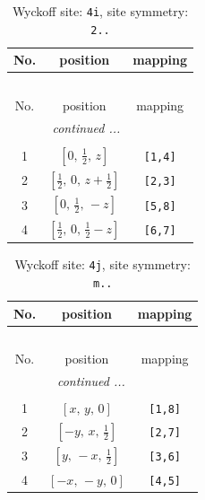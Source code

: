 \documentclass[fleqn,8pt]{jsarticle}
\begin{document}
\renewcommand{\arraystretch}{1.2}
\begin{longtable}{ccc}
\caption{Wyckoff site: {\tt 4i}, site symmetry: {\tt 2..}}
 \\
 \hline \hline
No. & position & mapping \\ \hline \endfirsthead

\multicolumn{2}{l}{\tablename\ \thetable{}} \\
 \hline \hline
No. & position & mapping \\ \hline \endhead

 \hline \hline
\multicolumn{2}{r}{\footnotesize\it continued ...} \\ \endfoot

 \hline \hline
\multicolumn{2}{r}{} \\ \endlastfoot

1 & $\left[ 0,\, \frac{1}{2},\, z \right]$ & {\tt [1,4]} \\ \hline
2 & $\left[ \frac{1}{2},\, 0,\, z + \frac{1}{2} \right]$ & {\tt [2,3]} \\ \hline
3 & $\left[ 0,\, \frac{1}{2},\, - z \right]$ & {\tt [5,8]} \\ \hline
4 & $\left[ \frac{1}{2},\, 0,\, \frac{1}{2} - z \right]$ & {\tt [6,7]} \\
\end{longtable}
\renewcommand{\arraystretch}{1.2}
\begin{longtable}{ccc}
\caption{Wyckoff site: {\tt 4j}, site symmetry: {\tt m..}}
 \\
 \hline \hline
No. & position & mapping \\ \hline \endfirsthead

\multicolumn{2}{l}{\tablename\ \thetable{}} \\
 \hline \hline
No. & position & mapping \\ \hline \endhead

 \hline \hline
\multicolumn{2}{r}{\footnotesize\it continued ...} \\ \endfoot

 \hline \hline
\multicolumn{2}{r}{} \\ \endlastfoot

1 & $\left[ x,\, y,\, 0 \right]$ & {\tt [1,8]} \\ \hline
2 & $\left[ - y,\, x,\, \frac{1}{2} \right]$ & {\tt [2,7]} \\ \hline
3 & $\left[ y,\, - x,\, \frac{1}{2} \right]$ & {\tt [3,6]} \\ \hline
4 & $\left[ - x,\, - y,\, 0 \right]$ & {\tt [4,5]} \\
\end{longtable}
\end{document}

